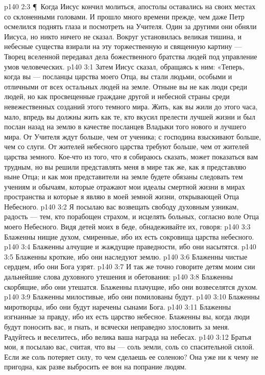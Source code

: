 \vs p140 2:3 \P\ Когда Иисус кончил молиться, апостолы оставались на своих местах со склоненными головами. И прошло много времени прежде, чем даже Петр осмелился поднять глаза и посмотреть на Учителя. Один за другими они обняли Иисуса, но никто ничего не сказал. Вокруг установилась великая тишина, и небесные существа взирали на эту торжественную и священную картину --- Творец вселенной передавал дела божественного братства людей под управление умов человеческих.
\vs p140 3:1 Затем Иисус сказал, обращаясь к ним: «Теперь, когда вы --- посланцы царства моего Отца, вы стали людьми, особыми и отличными от всех остальных людей на земле. Отныне вы не как люди среди людей, но как просвещенные граждане другой и небесной страны среди невежественных созданий этого темного мира. Жить, как вы жили до этого часа, мало, впредь вы должны жить как те, кто вкусил прелести лучшей жизни и был послан назад на землю в качестве посланцев Владыки того нового и лучшего мира. От Учителя ждут больше, чем от ученика; с господина взыскивают больше, чем со слуги. От жителей небесного царства требуют больше, чем от жителей царства земного. Кое\hyp{}что из того, что я собираюсь сказать, может показаться вам трудным, но вы решили представлять меня в мире так же, как я представляю ныне Отца; и как мои представители на земле будете обязаны следовать тем учениям и обычаям, которые отражают мои идеалы смертной жизни в мирах пространства и которые я являю в моей земной жизни, открывающей Отца Небесного.
\vs p140 3:2 Я посылаю вас возвещать свободу духовным узникам, радость --- тем, кто порабощен страхом, и исцелять больных, согласно воле Отца моего Небесного. Видя детей моих в беде, обнадеживайте их, говоря:
\vs p140 3:3 Блаженны нищие духом, смиренные, ибо их есть сокровища царства небесного.
\vs p140 3:4 Блаженны алчущие и жаждущие праведности, ибо они насытятся.
\vs p140 3:5 Блаженны кроткие, ибо они наследуют землю.
\vs p140 3:6 Блаженны чистые сердцем, ибо они Бога узрят.
\vs p140 3:7 И так же точно говорите детям моим сии дальнейшие слова духовного утешения и обетования:
\vs p140 3:8 Блаженны скорбящие, ибо они утешатся. Блаженны плачущие, ибо они возвеселятся духом.
\vs p140 3:9 Блаженны милостивые, ибо они помилованы будут.
\vs p140 3:10 Блаженны миротворцы, ибо они будут наречены сынами Бога.
\vs p140 3:11 Блаженны изгнанные за правду, ибо их есть царство небесное. Блаженны вы, когда люди будут поносить вас, и гнать, и всячески неправедно злословить за меня. Радуйтесь и веселитесь, ибо велика ваша награда на небесах.
\vs p140 3:12 Братья мои, я посылаю вас, считая, что вы --- соль земли, соль со спасительной силой. Если же соль потеряет силу, то чем сделаешь ее соленою? Она уже ни к чему не пригодна, как разве выбросить ее вон на попрание людям.
